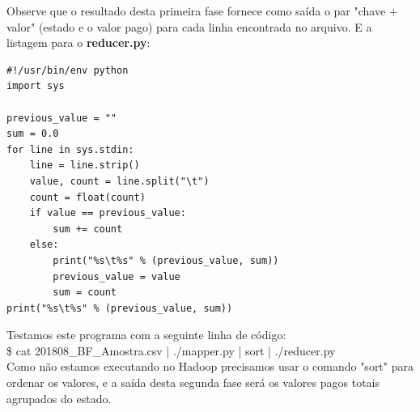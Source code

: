 \documentclass[a4paper,11pt]{article}
\begin{document}
Observe que o resultado desta primeira fase fornece como saída o par "chave + valor" (estado e o valor pago) para cada linha encontrada no arquivo. E a listagem para o \textbf{reducer.py}:
\begin{lstlisting}
#!/usr/bin/env python
import sys

previous_value = ""
sum = 0.0
for line in sys.stdin:
	line = line.strip()
	value, count = line.split("\t")
	count = float(count)
	if value == previous_value:
		sum += count
	else:
		print("%s\t%s" % (previous_value, sum))
		previous_value = value
		sum = count
print("%s\t%s" % (previous_value, sum))
\end{lstlisting}
Testamos este programa com a seguinte linha de código: \\
{\ttfamily\$ cat 201808\_BF\_Amostra.csv | ./mapper.py | sort | ./reducer.py} \\[2mm]
Como não estamos executando no Hadoop precisamos usar o comando "sort" para ordenar os valores, e a saída desta segunda fase será os valores pagos totais agrupados do estado.
\end{document}

